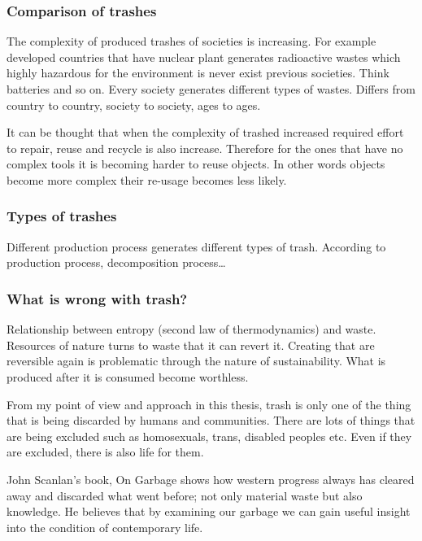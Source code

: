 \documentclass[12pt]{article}
\begin{document}
%
\subsubsection{Comparison of trashes}
The complexity of produced trashes of societies is increasing. For example developed countries that have nuclear plant generates radioactive wastes which highly hazardous for the environment is never exist previous societies. Think batteries and so on. Every society generates different types of wastes. Differs from country to country, society to society, ages to ages.

It can be thought that when the complexity of trashed increased required effort to repair, reuse and recycle is also increase. Therefore for the ones that have no complex tools it is becoming harder to reuse objects. In other words objects become more complex their re-usage becomes less likely. 

%
\subsubsection{Types of trashes}
Different production process generates different types of trash. According to production process, decomposition process\ldots

%
\subsubsection{What is wrong with trash?}
Relationship between entropy (second law of thermodynamics) and waste. Resources of nature turns to waste that it can revert it. Creating that are reversible again is problematic through the nature of sustainability. What is produced after it is consumed become worthless. 

From my point of view and approach in this thesis, trash is only one of the thing that is being discarded by humans and communities. There are lots of things that are being excluded such as homosexuals, trans, disabled peoples etc. Even if they are excluded, there is also life for them. 

John Scanlan's book, On Garbage shows how western progress always has cleared away and discarded what went before; not only material waste but also knowledge. He believes that by examining our garbage we can gain useful insight into the condition of contemporary life.

\end{document}
